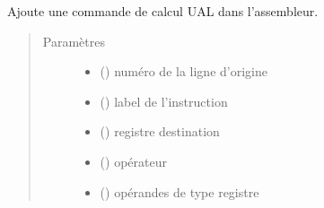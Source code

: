 \documentclass[letterpaper,10pt,french]{sphinxmanual}
\begin{document}
\begin{fulllineitems}
\begin{fulllineitems}
\begin{quote}
\begin{description}
\begin{itemize}
\end{itemize}

\end{description}\end{quote}

\end{fulllineitems}


\begin{fulllineitems}
\label{\detokenize{assembleurcontainer:assembleurcontainer.AssembleurContainer.pushUal}}
Ajoute une commande de calcul UAL dans l’assembleur.
\begin{quote}\begin{description}
\item[{Paramètres}] \leavevmode\begin{itemize}
\item {} 
 () \textendash{} numéro de la ligne d’origine

\item {} 
 (\sphinxstyleliteralemphasis{\sphinxupquote{{[}}}{\hyperref[\detokenize{label:label.Label}]{\sphinxcrossref{\sphinxstyleliteralemphasis{\sphinxupquote{Label}}}}}\sphinxstyleliteralemphasis{\sphinxupquote{{]}}}) \textendash{} label de l’instruction

\item {} 
 () \textendash{} registre destination

\item {} 
 () \textendash{} opérateur

\item {} 
 (\sphinxstyleliteralemphasis{\sphinxupquote{{[}}}\sphinxstyleliteralemphasis{\sphinxupquote{{]}}}) \textendash{} opérandes de type registre


\end{itemize}
\end{description}
\end{quote}
\end{fulllineitems}
\end{fulllineitems}
\end{document}

